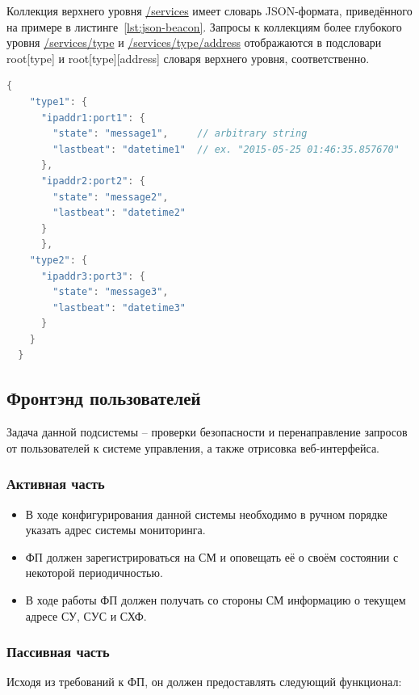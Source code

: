 \documentclass[a4paper,12pt]{report}
\numberwithin{equation}{section}
\begin{document}
  Коллекция верхнего уровня \url{/services} имеет словарь JSON-формата, приведённого на примере в листинге~\ref{lst:json-beacon}. Запросы к коллекциям более глубокого уровня \url{/services/type} и \url{/services/type/address} отображаются в подсловари root[type] и root[type][address] словаря верхнего уровня, соответственно.
  
  \begin{lstlisting}[float={},language=Java,caption={Пример JSON-представления коллекции верхнего уровня сервиса мониторинга},label=lst:json-beacon]
  {
    "type1": {
      "ipaddr1:port1": {
        "state": "message1",     // arbitrary string
        "lastbeat": "datetime1"  // ex. "2015-05-25 01:46:35.857670"
      },
      "ipaddr2:port2": {
        "state": "message2",
        "lastbeat": "datetime2"
      }
      },
    "type2": {
      "ipaddr3:port3": {
        "state": "message3",
        "lastbeat": "datetime3"
      }
    }
  }
  \end{lstlisting}
  
  \subsection{Фронтэнд пользователей}
  Задача данной подсистемы -- проверки безопасности и перенаправление запросов от пользователей к системе управления, а также отрисовка веб-интерфейса.
  
  \subsubsection{Активная часть}
  \begin{itemize}
    \item В ходе конфигурирования данной системы необходимо в ручном порядке указать адрес системы мониторинга.
    \item ФП должен зарегистрироваться на СМ и оповещать её о своём состоянии с некоторой периодичностью.
    \item В ходе работы ФП должен получать со стороны СМ информацию о текущем адресе СУ, СУС и СХФ.
  \end{itemize}
  
  \subsubsection{Пассивная часть}
  Исходя из требований к ФП, он должен предоставлять следующий функционал:
  
\end{document}
